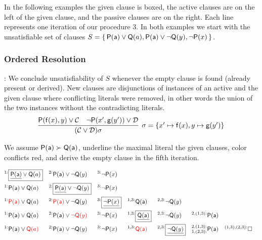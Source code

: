 In the following examples the given clause is boxed, 
the active clauses are on the left of the given clause, 
and the passive clauses are on the right. 
Each line represents one iteration of our procedure 3.
%
In both examples we start with the unsatisfiable set of clauses $S=\{\, {\mathsf P}({\mathsf a})\lor{\mathsf Q}(a), {\mathsf P}({\mathsf a})\lor\lnot{\mathsf Q}(y), \lnot{\mathsf P}(x) \,\}$.

\subsubsection{Ordered Resolution}

\jek : We conclude unsatisfiability of $S$ whenever the empty clause is found (already present or derived).
New clauses are disjunctions of instances of an active and the given clause where conflicting literals were removed, 
in other words the union of the two instances without the contradicting literals.
\begin{gather*}
\infer[\sigma=\{ x'\mapsto\mf(x), y\mapsto\mg(y') \}]{
	(\mcC \lor \mcD)\sigma
}{
	\mP(\mf(x), y) \lor \mcC & \lnot\mP(x',\mg(y')) \lor \mcD
}
\end{gather*}

\begin{example} We assume ${\mathsf P}({\mathsf a})\succ{\mathsf Q}({\mathsf a})$,
	underline the maximal literal the given clauses,
	color conflicts red,
	 and derive the empty clause in the fifth iteration.
	
	\begin{align*}
	^{1:}&\boxed{\underline{\mP(\ma)}\lor\mQ(a)} 
	& ^{2:}&\mP(\ma)\lor\lnot\mQ(y) & ^{3:}&\lnot\mP(x) 
	\\
	^{1:}&\mP(\ma)\lor\mQ(a) 
	& ^{2:}&\boxed{\underline{\mP(\ma)}\lor\lnot\mQ(y)} & ^{3:}&\lnot\mP(x) 
	\\
	^{1:}&{\colLo\mP(\ma)}\lor\mQ(a) 
	& ^{2:}&{\colLo\mP(\ma)}\lor\lnot\mQ(y) 
	& ^{3:}&\boxed{\underline{\lnot\mP(x)}} 
	& ^{1,3:}&\mQ(\ma) 
	& ^{2,3:}&\lnot\mQ(y)
	\\
	^{1:}&\mP(\ma)\lor\mQ(a) 
	& ^{2:}&\mP(\ma)\lor{\colLo\lnot\mQ(y)} 
	& ^{3:}&\lnot\mP(x)
	& ^{1,3:}&\boxed{\underline{\mQ(\ma)}} 
	& ^{2,3:}&\lnot\mQ(y) 
	& ^{2,(1,3):}&\mP(\ma)
	\\
	^{1:}&\mP(\ma)\lor{\colLo\mQ(a)} 
	& ^{2:}&\mP(\ma)\lor\lnot\mQ(y) 
	& ^{3:}&\lnot\mP(x)
	& ^{1,3:}&\colLo\mQ(\ma) 
	& ^{2,3:}&\boxed{\underline{\lnot\mQ(y)}} 
	& ^{2,(1,3):}_{1,(2,3):}&\mP(\ma)
	& ^{(1,3),(2,3):}&\emptyclause
	\\
	\end{align*}
\end{example}

